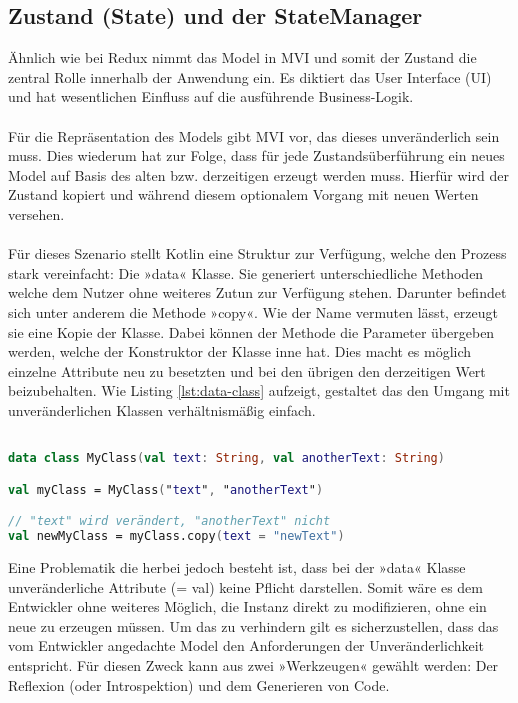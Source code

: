 \subsection{Zustand (State) und der StateManager}
Ähnlich wie bei Redux nimmt das Model in MVI und somit der Zustand die zentral Rolle innerhalb der Anwendung ein. Es diktiert das User Interface (UI) und hat wesentlichen Einfluss auf die ausführende Business-Logik.
\\
\\
Für die Repräsentation des Models gibt MVI vor, das dieses unveränderlich sein muss. Dies wiederum hat zur Folge, dass für jede Zustandsüberführung ein neues Model auf Basis des alten bzw. derzeitigen erzeugt werden muss. Hierfür wird der Zustand kopiert und während diesem optionalem Vorgang mit neuen Werten versehen. 
\\
\\
Für dieses Szenario stellt Kotlin eine Struktur zur Verfügung, welche den Prozess stark vereinfacht: Die »data« Klasse. Sie generiert unterschiedliche Methoden welche dem Nutzer ohne weiteres Zutun zur Verfügung stehen. Darunter befindet sich unter anderem die Methode »copy«. Wie der Name vermuten lässt, erzeugt sie eine Kopie der Klasse. Dabei können der Methode die Parameter übergeben werden, welche der Konstruktor der Klasse inne hat. Dies macht es möglich einzelne Attribute neu zu besetzten und bei den übrigen den derzeitigen Wert beizubehalten. Wie Listing
\ref{lst:data-class}
aufzeigt, gestaltet das den Umgang mit unveränderlichen Klassen verhältnismäßig einfach.
\begin{lstlisting}[caption={data class}, label={lst:data-class}, language=Kotlin]

data class MyClass(val text: String, val anotherText: String)

val myClass = MyClass("text", "anotherText")

// "text" wird verändert, "anotherText" nicht
val newMyClass = myClass.copy(text = "newText")
\end{lstlisting}
\bigskip
Eine Problematik die herbei jedoch besteht ist, dass bei der »data« Klasse unveränderliche Attribute (= val) keine Pflicht darstellen. Somit wäre es dem Entwickler ohne weiteres Möglich, die Instanz direkt zu modifizieren, ohne ein neue zu erzeugen müssen. Um das zu verhindern gilt es sicherzustellen, dass das vom Entwickler angedachte Model den Anforderungen der Unveränderlichkeit entspricht. Für diesen Zweck kann aus zwei »Werkzeugen« gewählt werden: Der Reflexion (oder Introspektion) und dem Generieren von Code.  
